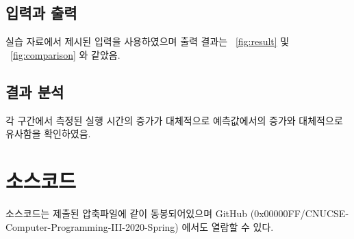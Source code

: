 \documentclass[UTF8]{report}
\begin{document}
        \section{입력과 출력}
            실습 자료에서 제시된 입력을 사용하였으며 출력 결과는 ~\ref{fig:result} 및 ~\ref{fig:comparison} 와 같았음.
        \section{결과 분석}
            각 구간에서 측정된 실행 시간의 증가가 대체적으로 예측값에서의 증가와 대체적으로 유사함을 확인하였음.

    \chapter{소스코드}
        소스코드는 제출된 압축파일에 같이 동봉되어있으며 GitHub (0x00000FF/CNUCSE-Computer-Programming-III-2020-Spring) 에서도 열람할 수 있다.
\end{document}
